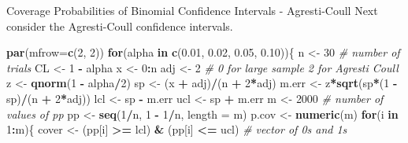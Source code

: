\documentclass[
  ignorenonframetext,
]{beamer}
\newenvironment{Shaded}{\begin{snugshade}}{\end{snugshade}}
\newcommand{\AttributeTok}[1]{\textcolor[rgb]{0.13,0.29,0.53}{#1}}
\newcommand{\CommentTok}[1]{\textcolor[rgb]{0.56,0.35,0.01}{\textit{#1}}}
\newcommand{\ControlFlowTok}[1]{\textcolor[rgb]{0.13,0.29,0.53}{\textbf{#1}}}
\newcommand{\DecValTok}[1]{\textcolor[rgb]{0.00,0.00,0.81}{#1}}
\newcommand{\FloatTok}[1]{\textcolor[rgb]{0.00,0.00,0.81}{#1}}
\newcommand{\FunctionTok}[1]{\textcolor[rgb]{0.13,0.29,0.53}{\textbf{#1}}}
\newcommand{\NormalTok}[1]{#1}
\newcommand{\OtherTok}[1]{\textcolor[rgb]{0.56,0.35,0.01}{#1}}
\newcommand{\SpecialCharTok}[1]{\textcolor[rgb]{0.81,0.36,0.00}{\textbf{#1}}}
\begin{document}
\begin{frame}[fragile]{Coverage Probabilities of Binomial Confidence
Intervals - Agresti-Coull}
\label{coverage-probabilities-of-binomial-confidence-intervals---agresti-coull}
Next consider the Agresti-Coull confidence intervals.

\tiny

\begin{Shaded}
\begin{Highlighting}[]
\FunctionTok{par}\NormalTok{(}\AttributeTok{mfrow=}\FunctionTok{c}\NormalTok{(}\DecValTok{2}\NormalTok{, }\DecValTok{2}\NormalTok{))}
\ControlFlowTok{for}\NormalTok{(alpha }\ControlFlowTok{in} \FunctionTok{c}\NormalTok{(}\FloatTok{0.01}\NormalTok{, }\FloatTok{0.02}\NormalTok{, }\FloatTok{0.05}\NormalTok{, }\FloatTok{0.10}\NormalTok{))\{}
\NormalTok{n }\OtherTok{\textless{}{-}} \DecValTok{30}     \CommentTok{\# number of trials}
\NormalTok{CL }\OtherTok{\textless{}{-}} \DecValTok{1} \SpecialCharTok{{-}}\NormalTok{ alpha}
\NormalTok{x }\OtherTok{\textless{}{-}} \DecValTok{0}\SpecialCharTok{:}\NormalTok{n }
\NormalTok{adj }\OtherTok{\textless{}{-}} \DecValTok{2}  \CommentTok{\# 0 for large sample 2 for Agresti Coull}
\NormalTok{z }\OtherTok{\textless{}{-}} \FunctionTok{qnorm}\NormalTok{(}\DecValTok{1} \SpecialCharTok{{-}}\NormalTok{ alpha}\SpecialCharTok{/}\DecValTok{2}\NormalTok{)}
\NormalTok{sp }\OtherTok{\textless{}{-}}\NormalTok{ (x }\SpecialCharTok{+}\NormalTok{ adj)}\SpecialCharTok{/}\NormalTok{(n }\SpecialCharTok{+} \DecValTok{2}\SpecialCharTok{*}\NormalTok{adj)}
\NormalTok{m.err }\OtherTok{\textless{}{-}}\NormalTok{ z}\SpecialCharTok{*}\FunctionTok{sqrt}\NormalTok{(sp}\SpecialCharTok{*}\NormalTok{(}\DecValTok{1} \SpecialCharTok{{-}}\NormalTok{ sp)}\SpecialCharTok{/}\NormalTok{(n }\SpecialCharTok{+} \DecValTok{2}\SpecialCharTok{*}\NormalTok{adj))}
\NormalTok{lcl }\OtherTok{\textless{}{-}}\NormalTok{ sp }\SpecialCharTok{{-}}\NormalTok{ m.err}
\NormalTok{ucl }\OtherTok{\textless{}{-}}\NormalTok{ sp }\SpecialCharTok{+}\NormalTok{ m.err}
\NormalTok{m }\OtherTok{\textless{}{-}} \DecValTok{2000} \CommentTok{\# number of values of pp}
\NormalTok{pp }\OtherTok{\textless{}{-}} \FunctionTok{seq}\NormalTok{(}\DecValTok{1}\SpecialCharTok{/}\NormalTok{n, }\DecValTok{1} \SpecialCharTok{{-}} \DecValTok{1}\SpecialCharTok{/}\NormalTok{n, }\AttributeTok{length =}\NormalTok{ m)}
\NormalTok{p.cov }\OtherTok{\textless{}{-}} \FunctionTok{numeric}\NormalTok{(m)}
\ControlFlowTok{for}\NormalTok{(i }\ControlFlowTok{in} \DecValTok{1}\SpecialCharTok{:}\NormalTok{m)\{}
\NormalTok{  cover }\OtherTok{\textless{}{-}}\NormalTok{ (pp[i] }\SpecialCharTok{\textgreater{}=}\NormalTok{ lcl) }\SpecialCharTok{\&}\NormalTok{ (pp[i] }\SpecialCharTok{\textless{}=}\NormalTok{ ucl)  }\CommentTok{\# vector of 0s and 1s}

\end{Highlighting}
\end{Shaded}
\end{frame}
\end{document}
